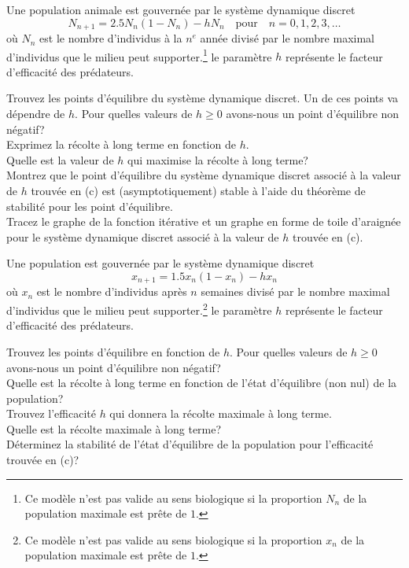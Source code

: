 \begin{question}[\life]
Une population animale est gouvernée par le système dynamique discret
\[
N_{n+1} = 2.5 N_n (1-N_n) - h N_n \quad \text{pour} \quad n=0, 1, 2, 3,\ldots
\]
où $N_n$ est le nombre d'individus à la $n^e$ année divisé par le nombre
maximal d'individus que le milieu peut supporter.\footnote{Ce modèle
n'est pas valide au sens biologique si la proportion $N_n$ de la
population maximale est prête de $1$.}  le paramètre $h$ représente
le facteur d'efficacité des prédateurs.

 Trouvez les points d'équilibre du système dynamique discret.  Un de
ces points va dépendre de $h$.  Pour quelles valeurs de $h\geq 0$
avons-nous un point d'équilibre non négatif?\\
 Exprimez la récolte à long terme en fonction de $h$.\\
 Quelle est la valeur de $h$ qui maximise la récolte à long
terme?\\
 Montrez que le point d'équilibre du système dynamique discret
associé à la valeur de $h$ trouvée en (c) est (asymptotiquement)
stable à l'aide du théorème de stabilité pour les point d'équilibre.\\
 Tracez le graphe de la fonction itérative et un graphe en forme de
toile d'araignée pour le système dynamique discret associé à la valeur de
$h$ trouvée en (c).
\label{6Q116}
\end{question}

\begin{question}[\life]
Une population est gouvernée par le système dynamique discret
\[
x_{n+1} = 1.5 x_n(1-x_n) - hx_n
\]
où $x_n$ est le nombre d'individus après $n$ semaines divisé par le
nombre maximal d'individus que le milieu peut supporter.\footnote{Ce
modèle n'est pas valide au sens biologique si la proportion $x_n$ de
la population maximale est prête de $1$.}  le paramètre
$h$ représente le facteur d'efficacité des prédateurs.

 Trouvez les points d'équilibre en fonction de $h$.    Pour
quelles valeurs de $h\geq 0$ avons-nous un point d'équilibre non négatif?\\
 Quelle est la récolte à long terme en fonction de l'état
d'équilibre (non nul) de la population?\\
 Trouvez l'efficacité $h$ qui donnera la récolte maximale à
long terme.\\
 Quelle est la récolte maximale à long terme?\\
 Déterminez la stabilité de l'état d'équilibre de la population pour
l'efficacité trouvée en (c)?
\label{6Q117}
\end{question}

